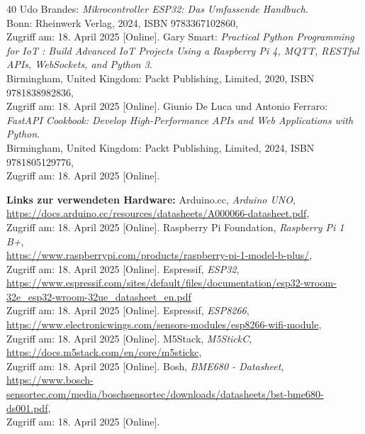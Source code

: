 \documentclass[12pt, letterpaper]{article}
\begin{document}
\begin{thebibliography}{40}
  Udo Brandes: \textit{Mikrocontroller ESP32: Das Umfassende Handbuch}. \\Bonn: Rheinwerk Verlag, 2024, ISBN 9783367102860, \\ Zugriff am: 18. April 2025 [Online].
  Gary Smart: \textit{Practical Python Programming for IoT : Build Advanced IoT Projects Using a Raspberry Pi 4, MQTT, RESTful APIs, WebSockets, and Python 3}. \\ Birmingham, United Kingdom: Packt Publishing, Limited, 2020, ISBN 9781838982836, \\Zugriff am: 18. April 2025 [Online].
  Giunio De Luca und Antonio Ferraro: \textit{FastAPI Cookbook: Develop High-Performance APIs and Web Applications with Python}.\\  Birmingham, United Kingdom: Packt Publishing, Limited, 2024, ISBN 9781805129776, \\ Zugriff am: 18. April 2025 [Online].
  \par \textbf{Links zur verwendeten Hardware:}
  Arduino.cc, \textit{Arduino UNO}, \\ \url{https://docs.arduino.cc/resources/datasheets/A000066-datasheet.pdf}, \\ Zugriff am: 18. April 2025 [Online].
  Raspberry Pi Foundation, \textit{Raspberry Pi 1 B+},\\ \url{https://www.raspberrypi.com/products/raspberry-pi-1-model-b-plus/}, \\ Zugriff am: 18. April 2025 [Online].
  Espressif, \textit{ESP32}, \\ \url{https://www.espressif.com/sites/default/files/documentation/esp32-wroom-32e_esp32-wroom-32ue_datasheet_en.pdf} \\ Zugriff am: 18. April 2025 [Online].
  Espressif, \textit{ESP8266}, \\ \url{https://www.electronicwings.com/sensors-modules/esp8266-wifi-module}, \\ Zugriff am: 18. April 2025 [Online].
  M5Stack, \textit{M5StickC}, \\ \url{https://docs.m5stack.com/en/core/m5stickc}, \\ Zugriff am: 18. April 2025 [Online].
  Bosh, \textit{BME680 - Datasheet}, \\ \url{https://www.bosch-sensortec.com/media/boschsensortec/downloads/datasheets/bst-bme680-ds001.pdf}, \\ Zugriff am: 18. April 2025 [Online].

\end{thebibliography}
\end{document}
